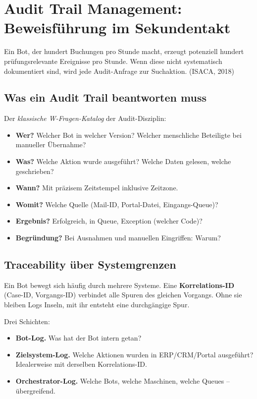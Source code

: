 \documentclass[11pt,a4paper,oneside]{article}
\newcommand{\fachbegriff}[1]{\textbf{#1}}
\newcommand{\quelle}[1]{{\footnotesize\color{lpGray}(#1)}}
\begin{document}
\section{Audit Trail Management: Beweisführung im Sekundentakt}

Ein Bot, der hundert Buchungen pro Stunde macht, erzeugt potenziell hundert prüfungsrelevante Ereignisse pro Stunde. Wenn diese nicht systematisch dokumentiert sind, wird jede Audit-Anfrage zur Suchaktion. \quelle{ISACA, 2018}

\subsection{Was ein Audit Trail beantworten muss}

Der \emph{klassische W-Fragen-Katalog} der Audit-Disziplin:

\begin{itemize}
  \item \textbf{Wer?} Welcher Bot in welcher Version? Welcher menschliche Beteiligte bei manueller Übernahme?
  \item \textbf{Was?} Welche Aktion wurde ausgeführt? Welche Daten gelesen, welche geschrieben?
  \item \textbf{Wann?} Mit präzisem Zeitstempel inklusive Zeitzone.
  \item \textbf{Womit?} Welche Quelle (Mail-ID, Portal-Datei, Eingangs-Queue)?
  \item \textbf{Ergebnis?} Erfolgreich, in Queue, Exception (welcher Code)?
  \item \textbf{Begründung?} Bei Ausnahmen und manuellen Eingriffen: Warum?
\end{itemize}

\subsection{Traceability über Systemgrenzen}

Ein Bot bewegt sich häufig durch mehrere Systeme. Eine \fachbegriff{Korrelations-ID} (Case-ID, Vorgangs-ID) verbindet alle Spuren des gleichen Vorgangs. Ohne sie bleiben Logs Inseln, mit ihr entsteht eine durchgängige Spur.

Drei Schichten:

\begin{itemize}
  \item \textbf{Bot-Log.} Was hat der Bot intern getan?
  \item \textbf{Zielsystem-Log.} Welche Aktionen wurden in ERP/CRM/Portal ausgeführt? Idealerweise mit derselben Korrelations-ID.
  \item \textbf{Orchestrator-Log.} Welche Bots, welche Maschinen, welche Queues -- übergreifend.
\end{itemize}
\end{document}
